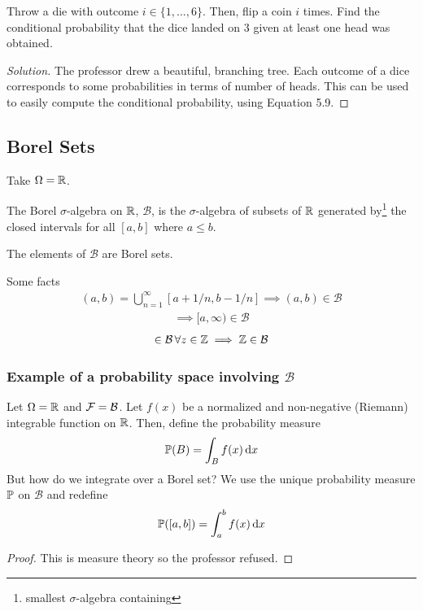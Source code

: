 \begin{example}
    Throw a die with outcome $i \in \{1, \ldots, 6\}$. Then, flip a coin $i$ times. Find the conditional probability that the dice landed on $3$ given at least one head was obtained.
    \begin{proof}[Solution]
        The professor drew a beautiful, branching tree. Each outcome of a dice corresponds to some probabilities in terms of number of heads. This can be used to easily compute the conditional probability, using Equation 5.9.
    \end{proof}
\end{example}

\subsection{Borel Sets}
Take $\Omega = \mathbb{R}$.
\begin{definition}
    The Borel $\sigma$-algebra on $\mathbb{R}$, $\mathcal{B}$, is the $\sigma$-algebra of subsets of $\mathbb{R}$ generated by\footnote{smallest $\sigma$-algebra containing} the closed intervals for all $[a,b]$ where $a \le b$.
\end{definition}
The elements of $\mathcal{B}$ are Borel sets.
\begin{proposition}
    Some facts
    \begin{align}
        (a,b) = \bigcup_{n=1}^\infty [a + 1/n, b - 1/n] \implies {(a,b) \in \mathcal{B}}
    \end{align}
    \begin{align}
        [a,\infty) = \bigcup_{n=1}^\infty [a, a + n] \implies {[a,\infty) \in \mathcal{B}}
    \end{align}
    \begin{align}
        [z,z] \in \mathcal{B} \, \forall z \in \integer \implies \integer \in \mathcal{B}
    \end{align}
\end{proposition}

\subsubsection{Example of a probability space involving $\mathcal{B}$}
Let $\Omega = \mathbb{R}$ and $\mathcal{F} = \mathcal{B}$. Let $f(x)$ be a normalized and non-negative (Riemann) integrable function on $\mathbb{R}$. Then, define the probability measure
\begin{align}
    \mathbb{P}(B) = \int_{B} f(x) \dd{x}
\end{align}
But how do we integrate over a Borel set? We use the unique probability measure $\mathbb{P}$ on $\mathcal{B}$ and redefine
\begin{align}
    \mathbb{P}([a,b]) = \int_a^b f(x) \dd{x}
\end{align}
\begin{proof}
    This is measure theory so the professor refused.
\end{proof}

